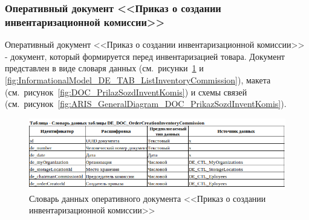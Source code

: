 %
%
%
%
%



\newpage
\subsubsection{Оперативный документ <<Приказ о создании инвентаризационной комиссии>>}

Оперативный документ <<Приказ о создании инвентаризационной комиссии>>
- документ, который формируется перед инвентаризацией товара.
Документ представлен в виде словаря данных (см.~рисунки~\ref{fig:InformationalModel_DE_DOC_OrderCreationInventoryCommission} и \ref{fig:InformationalModel_DE_TAB_ListInventoryCommission}),
макета (см.~рисунок~\ref{fig:DOC_PrilazSozdInventKomis})
и схемы связей (см.~рисунок~\ref{fig:ARIS_GeneralDiagram_DOC_PrikazSozdInventKomis}).

\begin{figure}[!h]
    \centering
    \includegraphics[width=16cm]
    {assets/InformationalModel/DE_DOC_OrderCreationInventoryCommission.png}
    \caption{Словарь данных оперативного документа <<Приказ о создании инвентаризационной комиссии>>}
    \label{fig:InformationalModel_DE_DOC_OrderCreationInventoryCommission}
\end{figure}

